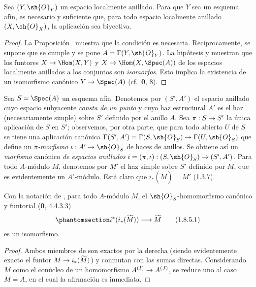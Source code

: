 \documentclass[oneside,10pt]{amsart}
\makeatletter
\newcommand{\ega@arrow}[2]{\mathchoice{#1}{#2}{#2}{#2}}
\renewcommand{\to}{\ega@arrow{\longrightarrow}{\rightarrow}}
\let\EGAOriginalLabel\label
\renewcommand{\label}[1]{\phantomsection\EGAOriginalLabel{#1}}
\makeatother
\begin{document}
\begin{corollary}[1.8.3]
\label{ega2:addendum:I.1.8.3-fr}
Sea $(Y,\sh{O}_Y)$ un espacio localmente anillado. Para que $Y$ sea un
esquema afín, es necesario y suficiente que, para todo espacio
localmente anillado $(X,\sh{O}_X)$, la aplicación  sea
biyectiva.
\end{corollary}

\begin{proof}
La Proposición~ muestra que la condición es necesaria.
Recíprocamente, se supone que se cumple y se pone
$A=\Gamma(Y,\sh{O}_Y)$. La hipótesis y  muestran que los
funtores
$X\to\Hom(X,Y)$ y $X\to\Hom(X,\Spec(A))$
de los espacios localmente anillados a los conjuntos son \emph{isomorfos}.
Esto implica la existencia de un isomorfismo canónico
$Y\to\Spec(A)$ (cf.~\textbf 0, 8).
\end{proof}

\begin{env}[1.8.4]
\label{ega2:addendum:I.1.8.4-fr}
Sea $S=\Spec(A)$ un esquema afín. Denotemos por $(S',A')$ el espacio
anillado cuyo espacio subyacente \emph{consta de un punto} y cuyo haz
estructural $A'$ es el haz (necesariamente simple) sobre $S'$ definido
por el anillo $A$. Sea $\pi:S\to S'$ la única aplicación de $S$ en $S'$; observemos, por otra parte, que para todo
abierto $U$ de $S$ se tiene una aplicación canónica
$\Gamma(S',A')=\Gamma(S,\sh{O}_S)\to\Gamma(U,\sh{O}_S)$
que define un \emph{$\pi$-morfismo} $\iota:A'\to\sh{O}_S$ de haces de anillos.
Se obtiene así un \emph{morfismo} canónico \emph{de espacios anillados}
$i=(\pi,\iota):(S,\sh{O}_S)\to(S',A')$.
Para todo $A$-módulo $M$, denotemos por $M'$ el haz simple sobre $S'$
definido por $M$, que es evidentemente un $A'$-módulo. Está claro que
$i_*(\widetilde M)=M'$ (1.3.7).
\end{env}

\begin{lemma}[1.8.5]
\label{ega2:addendum:I.1.8.5-fr}
Con la notación de , para todo $A$-módulo $M$, el
$\sh{O}_S$-homomorfismo canónico y funtorial \textup{(\textbf{0}, 4.4.3.3)}
\begin{equation}
\label{ega2:addendum:I.1.8.5.1-fr}
  i^*(i_*(\widetilde M))\to\widetilde M
\tag{1.8.5.1}
\end{equation}
es un isomorfismo.
\end{lemma}

\begin{proof}
Ambos miembros de  son exactos por la derecha
(siendo evidentemente exacto el funtor
$M\to i_*(\widetilde M)$) y conmutan con las sumas directas.
Considerando $M$ como el conúcleo de un homomorfismo
$A^{(I)}\to A^{(J)}$, se reduce uno al caso $M=A$, en el cual la
afirmación es inmediata.
\end{proof}
\end{document}
